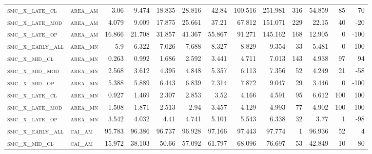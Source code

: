 \begin{landscape}
\begin{center}
\begin{footnotesize}
\begin{longtable}{llrrrrrrrr|rrr}
\textsc{smc\_x\_late\_cl  } & \textsc{area\_am  }   & 3.06     & 9.474    & 18.835   & 28.816   & 42.84    & 100.516  & 251.981  & 316    & 54.859        & 85            & 70              \\
\textsc{smc\_x\_late\_mod } & \textsc{area\_am  }   & 4.079    & 9.009    & 17.875   & 25.661   & 37.21    & 67.812   & 151.071  & 229    & 22.15         & 40            & -20             \\
\textsc{smc\_x\_late\_op  } & \textsc{area\_am  }   & 16.866   & 21.708   & 31.857   & 41.367   & 55.867   & 91.271   & 145.162  & 168    & 12.905        & 0             & -100            \\
\textsc{smc\_x\_early\_all} & \textsc{area\_mn  }   & 5.9      & 6.322    & 7.026    & 7.688    & 8.327    & 8.829    & 9.354    & 33     & 5.481         & 0             & -100            \\
\textsc{smc\_x\_mid\_cl   } & \textsc{area\_mn  }   & 0.263    & 0.992    & 1.686    & 2.592    & 3.441    & 4.711    & 7.013    & 143    & 4.938         & 97            & 94              \\
\textsc{smc\_x\_mid\_mod  } & \textsc{area\_mn  }   & 2.568    & 3.612    & 4.395    & 4.848    & 5.357    & 6.113    & 7.356    & 52     & 4.249         & 21            & -58             \\
\textsc{smc\_x\_mid\_op   } & \textsc{area\_mn  }   & 5.388    & 5.889    & 6.443    & 6.839    & 7.314    & 7.872    & 9.047    & 29     & 3.446         & 0             & -100            \\
\textsc{smc\_x\_late\_cl  } & \textsc{area\_mn  }   & 0.927    & 1.469    & 2.307    & 2.853    & 3.52     & 4.166    & 4.591    & 95     & 6.612         & 100           & 100             \\
\textsc{smc\_x\_late\_mod } & \textsc{area\_mn  }   & 1.508    & 1.871    & 2.513    & 2.94     & 3.457    & 4.129    & 4.993    & 77     & 4.902         & 100           & 100             \\
\textsc{smc\_x\_late\_op  } & \textsc{area\_mn  }   & 3.542    & 4.032    & 4.41     & 4.741    & 5.101    & 5.543    & 6.338    & 32     & 3.77          & 1             & -98             \\
\textsc{smc\_x\_early\_all} & \textsc{cai\_am   }   & 95.783   & 96.386   & 96.737   & 96.928   & 97.166   & 97.443   & 97.774   & 1      & 96.936        & 52            & 4               \\
\textsc{smc\_x\_mid\_cl   } & \textsc{cai\_am   }   & 15.972   & 38.103   & 50.66    & 57.092   & 61.797   & 68.096   & 76.697   & 53     & 42.849        & 10            & -80             \\

\end{longtable}
\end{footnotesize}
\end{center}
\end{landscape}
